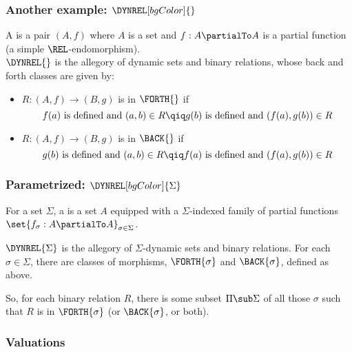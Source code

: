 {    \begin{frame}
        \frametitle{Another example: $\DYNREL[bgColor]{}$}
         A  is a pair $(A,f)$ where $A$ is a set and $f:A\partialTo A$ is a partial function (a simple $\REL$-endomorphism).\\ \pause
         $\DYNREL{}$ is the allegory of dynamic sets and binary relations, whose back and forth classes are given by:\pause
            {\large \begin{itemize}
                \item $R:(A,f)\to(B,g)$ is in $\FORTH{}$ if
                    \[ f(a)\text{ is defined and }(a,b)\in R \qiq g(b)\text{ is defined and }(f(a),g(b))\in R \]\pause
                \item $R:(A,f)\to(B,g)$ is in $\BACK{}$ if
                    \[ g(b)\text{ is defined and }(a,b)\in R \qiq f(a)\text{ is defined and }(f(a),g(b))\in R \]
            \end{itemize}}
    \end{frame}

    \begin{frame}
        \frametitle{Parametrized: $\DYNREL[bgColor]{\Sigma}$}
         For a set $\Sigma$, a  is a set $A$ equipped with a $\Sigma$-indexed family of partial functions $\set{f_{\sigma}:A\partialTo A}_{\sigma\in\Sigma}$. \pause

         $\DYNREL{\Sigma}$ is the allegory of $\Sigma$-dynamic sets and binary relations. \pause For each $\sigma\in\Sigma$, there are classes of morphisms, $\FORTH{\sigma}$ and $\BACK{\sigma}$, defined as above.

        \vspace{0.5cm}\pause

        So, for each binary relation $R$, there is some subset $\Pi\sub\Sigma$ of all those $\sigma$ such that $R$ is in $\FORTH{\sigma}$ (or $\BACK{\sigma}$, or both).

    \end{frame}


    \begin{frame}

    \end{frame}


    \begin{frame}
        \frametitle{Valuations}


\end{frame}}
